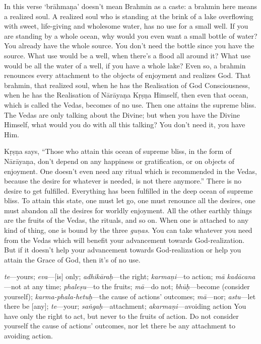 In this verse ‘brāhmaṇa’ doesn’t mean Brahmin as a caste: a brahmin here means a realized soul. A realized soul who is standing at the brink of a lake overflowing with sweet, life-giving and wholesome water, has no use for a small well. If you are standing by a whole ocean, why would you even want a small bottle of water? You already have the whole source. You don’t need the bottle since you have the source. What use would be a well, when there’s a flood all around it? What use would be all the water of a well, if you have a whole lake? Even so, a brahmin renounces every attachment to the objects of enjoyment and realizes God. That brahmin, that realized soul, when he has the Realisation of God Consciousness, when he has the Realisation of Nārāyaṇa Kṛṣṇa Himself, then even that ocean, which is called the Vedas, becomes of no use. Then one attains the supreme bliss. The Vedas are only talking about the Divine; but when you have the Divine Himself, what would you do with all this talking? You don’t need it, you have Him.

Kṛṣṇa says, “Those who attain this ocean of supreme bliss, in the form of Nārāyaṇa, don’t depend on any happiness or gratification, or on objects of enjoyment. One doesn’t even need any ritual which is recommended in the Vedas, because the desire for whatever is needed, is not there anymore.” There is no desire to get fulfilled. Everything has been fulfilled in the deep ocean of supreme bliss. To attain this state, one must let go, one must renounce all the desires, one must abandon all the desires for worldly enjoyment. All the other earthly things are the fruits of the Vedas, the rituals, and so on. When one is attached to any kind of thing, one is bound by the three \textit{guṇas}. You can take whatever you need from the Vedas which will benefit your advancement towards God-realization. But if it doesn’t help your advancement towards God-realization or help you attain the Grace of God, then it’s of no use.

{%
  \textit{te}---yours; 
  \textit{eva}---[is] only; 
  \textit{adhikāraḥ}---the right; 
  \textit{karmaṇi}---to action; 
  \textit{mā kadācana}---not at any time; 
  \textit{phaleṣu}---to the fruits; 
  \textit{mā}---do not; 
  \textit{bhūḥ}---become (consider yourself); 
  \textit{karma-phala-hetuḥ}---the cause of actions' outcomes; 
  \textit{mā}---nor; 
  \textit{astu}---let there be [any]; 
  \textit{te}---your; 
  \textit{saṅgaḥ}---attachment; 
  \textit{akarmaṇi}---avoiding action
}
{%
  You have only the right to act, but never to the fruits of action. Do not consider yourself the cause of actions' outcomes, nor let there be any attachment to avoiding action.
}

